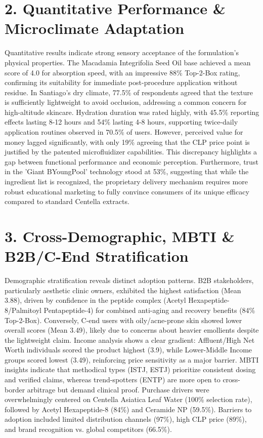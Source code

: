 \documentclass[10pt,twocolumn,a4paper]{article}
\begin{document}
\section{2. Quantitative Performance \& Microclimate Adaptation}
Quantitative results indicate strong sensory acceptance of the formulation's physical properties. The Macadamia Integrifolia Seed Oil base achieved a mean score of 4.0 for absorption speed, with an impressive 88\% Top-2-Box rating, confirming its suitability for immediate post-procedure application without residue. In Santiago's dry climate, 77.5\% of respondents agreed that the texture is sufficiently lightweight to avoid occlusion, addressing a common concern for high-altitude skincare. Hydration duration was rated highly, with 45.5\% reporting effects lasting 8-12 hours and 54\% lasting 4-8 hours, supporting twice-daily application routines observed in 70.5\% of users. However, perceived value for money lagged significantly, with only 19\% agreeing that the CLP price point is justified by the patented microfluidizer capabilities. This discrepancy highlights a gap between functional performance and economic perception. Furthermore, trust in the 'Giant BYoungPool' technology stood at 53\%, suggesting that while the ingredient list is recognized, the proprietary delivery mechanism requires more robust educational marketing to fully convince consumers of its unique efficacy compared to standard Centella extracts.
\section{3. Cross-Demographic, MBTI \& B2B/C-End Stratification}
Demographic stratification reveals distinct adoption patterns. B2B stakeholders, particularly aesthetic clinic owners, exhibited the highest satisfaction (Mean 3.88), driven by confidence in the peptide complex (Acetyl Hexapeptide-8/Palmitoyl Pentapeptide-4) for combined anti-aging and recovery benefits (84\% Top-2-Box). Conversely, C-end users with oily/acne-prone skin showed lower overall scores (Mean 3.49), likely due to concerns about heavier emollients despite the lightweight claim. Income analysis shows a clear gradient: Affluent/High Net Worth individuals scored the product highest (3.9), while Lower-Middle Income groups scored lowest (3.49), reinforcing price sensitivity as a major barrier. MBTI insights indicate that methodical types (ISTJ, ESTJ) prioritize consistent dosing and verified claims, whereas trend-spotters (ENTP) are more open to cross-border arbitrage but demand clinical proof. Purchase drivers were overwhelmingly centered on Centella Asiatica Leaf Water (100\% selection rate), followed by Acetyl Hexapeptide-8 (84\%) and Ceramide NP (59.5\%). Barriers to adoption included limited distribution channels (97\%), high CLP price (89\%), and brand recognition vs. global competitors (66.5\%).
\end{document}

